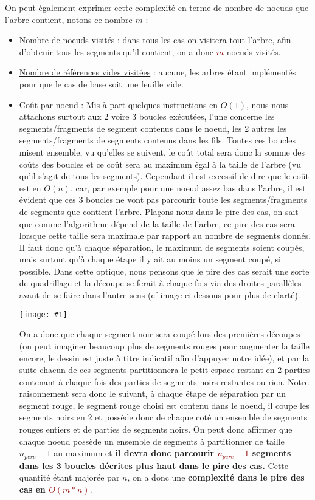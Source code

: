 \documentclass{article}
\newcommand{\red}[1]{\textcolor{darkred}{#1}}
\newcommand{\img}[1]{\begin{center}\texttt{[image: \#1]}\end{center}}
\begin{document}
On peut également exprimer cette complexité en terme de nombre de noeuds que l'arbre contient, notons ce nombre $m$ :
\begin{itemize}
\item \underline{Nombre de noeuds visités} : dans tous les cas on visitera tout l'arbre, afin d'obtenir tous les segments qu'il contient, on a donc \red{$m$} noeuds visités.
\item \underline{Nombre de références vides visitées} :  aucune, les arbres étant implémentés pour que le cas de base soit une feuille vide.
\item \underline{Coût par noeud} : Mis à part quelques instructions en $O(1)$, nous nous attachons surtout aux 2 voire 3 boucles exécutées, l'une concerne les 
segments/fragments de segment contenus dans le noeud, les 2 autres les segments/fragments de segments contenus dans les fils. Toutes ces boucles misent ensemble, vu qu'elles 
se suivent, le coût total sera donc la somme des coûts des boucles et ce coût sera au maximum égal à la taille de l'arbre (vu qu'il s'agit de tous les segments). Cependant il est 
excessif de dire que le coût est en $O(n)$, car, par exemple pour une noeud assez bas dans l'arbre, il est évident que ces 3 boucles ne vont pas parcourir toute les 
segments/fragments de segments  que contient l'arbre. Plaçons nous dans le pire des cas, on sait que comme l'algorithme dépend de la taille de l'arbre, ce pire des cas sera lorsque 
cette taille sera maximale par rapport au nombre de segments donnés. Il faut donc qu'à chaque séparation, le maximum de segments soient coupés, mais surtout qu'à chaque étape 
il y ait au moins un segment coupé, si possible. Dans cette optique, nous pensons que le pire des cas serait une sorte de quadrillage et la découpe se ferait à chaque fois via des 
droites parallèles avant de se faire dans l'autre sens (cf image ci-dessous pour plus de clarté). 

\img{sdd.png}

On a donc que chaque segment noir sera coupé lors des premières découpes (on peut imaginer beaucoup plus de segments rouges pour augmenter la taille encore, le dessin est juste 
à titre indicatif afin d'appuyer notre idée), et par la suite chacun de ces segments partitionnera le petit espace restant en 2 parties contenant à chaque fois des parties de 
segments noirs restantes ou rien. Notre raisonnement sera donc le suivant, à chaque étape de séparation par un segment rouge, le segment rouge choisi est contenu dans le noeud, il 
coupe les  segments noirs en 2 et possède donc de chaque coté un ensemble de segments rouges entiers et de parties de segments noirs. On peut donc affirmer que chaque noeud 
possède un ensemble de segments à partitionner de taille $n_{pere}-1$ au maximum et \textbf{il devra donc parcourir \red{$n_{pere}-1$} segments dans les 3 boucles décrites 
plus haut dans le pire des cas.} Cette quantité étant majorée par $n$, on a donc une \textbf{complexité dans le pire des cas en \red{$O(m*n)$}}. \\
\end{itemize}
\end{document}
